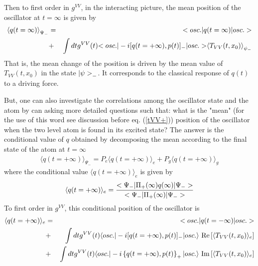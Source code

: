 Then to first order in
$g^{VV}$, in the interacting picture, the mean position of the oscillator
at $t=\infty$ is given by
\begin{eqnarray}
\mbox{$ \langle q(t=\infty) \rangle $}_{\Psi_-} &=& \mbox{$ < osc. \vert $}q(t=\infty) \mbox{$ \vert osc. > $}
\nonumber\\
&+&
\int dt  g^{VV}(t)
\mbox{$ < osc. \vert $} -i[q(t=+\infty),p(t)]_- \mbox{$ \vert osc. > $} \mbox{$ \langle T_{VV}(t,x_0) \rangle $}_{{\psi}_-}
\nonumber\\
\label{meanchange}
\end{eqnarray}
That is, the mean change of the position is driven by the mean value
of $T_{VV}(t,x_0)$ in the state $\mbox{$ \vert \psi > $}_-$.
It corresponds to the classical response of $q(t)$ to a driving force.

But, one can also
investigate the correlations among the oscillator state and the
atom by can asking more detailed questions such that:
what is the "mean" (for the use of this
word see discussion before eq.
(\ref{tVV+}))
position of the oscillator when the two level atom is found in its excited
state?
The answer is the conditional value of $q$ obtained by
decomposing the mean according to the final state of the atom at
$t=\infty$
\begin{eqnarray}
\langle q(t=+\infty) \rangle_{{\Psi}_-} = P_e
\langle q(t=+\infty) \rangle_e + P_g
\langle q(t=+\infty) \rangle_g
\label{oo13}
\end{eqnarray}
where the conditional value $\langle q(t=+\infty) \rangle_e$ is given by
\begin{equation}
\langle q(t=+\infty) \rangle_e = { \mbox{$ < \Psi_- \vert $} \Pi_+(\infty) q(\infty)
\mbox{$ \vert \Psi_- > $} \over \mbox{$ < \Psi_- \vert $} \Pi_+(\infty) \mbox{$ \vert \Psi_-  > $}}
\label{qe}
\end{equation}
To first order in
$g^{VV}$, this conditional  position of the oscillator is
\begin{eqnarray}
\langle q(t=+\infty) \rangle_e
&=& \mbox{$ < osc. \vert $}q(t=-\infty) \mbox{$ \vert osc. > $}
\nonumber\\
&+&
\int dt  g^{VV}(t)
\langle osc.
\vert -i[q(t=+\infty),p(t)]_-\vert osc.\rangle
\mbox{ Re} \left[ \langle T_{VV}(t,x_0)\rangle_e\right]
\nonumber\\
&+&
\int dt  g^{VV}(t) \langle osc.
\vert -i\left \{q(t=+\infty),p(t)\right\}_+\vert
osc.\rangle
\mbox{ Im} \left[\langle T_{VV}(t,x_0)\rangle_e\right]
\nonumber\\
\label{ootwelve}
\end{eqnarray}

